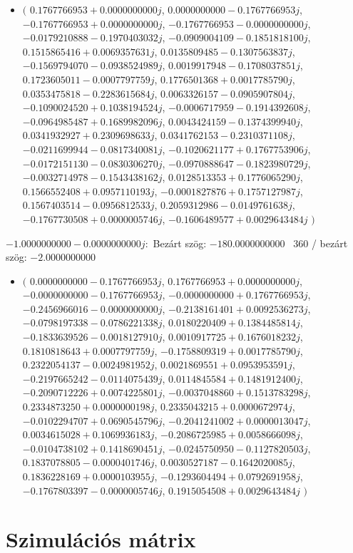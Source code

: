 \documentclass[14pt,a4paper]{article}
\begin{document}
\begin{itemize}
\item
$\big($
$0.1767766953+0.0000000000j$, $0.0000000000-0.1767766953j$, $-0.1767766953+0.0000000000j$, $-0.1767766953-0.0000000000j$, $-0.0179210888-0.1970403032j$, $-0.0909004109-0.1851818100j$, $0.1515865416+0.0069357631j$, $0.0135809485-0.1307563837j$, $-0.1569794070-0.0938524989j$, $0.0019917948-0.1708037851j$, $0.1723605011-0.0007797759j$, $0.1776501368+0.0017785790j$, $0.0353475818-0.2283615684j$, $0.0063326157-0.0905907804j$, $-0.1090024520+0.1038194524j$, $-0.0006717959-0.1914392608j$, $-0.0964985487+0.1689982096j$, $0.0043424159-0.1374399940j$, $0.0341932927+0.2309698633j$, $0.0341762153-0.2310371108j$, $-0.0211699944-0.0817340081j$, $-0.1020621177+0.1767753906j$, $-0.0172151130-0.0830306270j$, $-0.0970888647-0.1823980729j$, $-0.0032714978-0.1543438162j$, $0.0128513353+0.1776065290j$, $0.1566552408+0.0957110193j$, $-0.0001827876+0.1757127987j$, $0.1567403514-0.0956812533j$, $0.2059312986-0.0149761638j$, $-0.1767730508+0.0000005746j$, $-0.1606489577+0.0029643484j$
$\big)$
\end{itemize}
$-1.0000000000-0.0000000000j$:\
Bezárt szög: $-180.0000000000$ \
360 / bezárt szög: $-2.0000000000$\
\begin{itemize}
\item
$\big($
$0.0000000000-0.1767766953j$, $0.1767766953+0.0000000000j$, $-0.0000000000-0.1767766953j$, $-0.0000000000+0.1767766953j$, $-0.2456966016-0.0000000000j$, $-0.2138161401+0.0092536273j$, $-0.0798197338-0.0786221338j$, $0.0180220409+0.1384485814j$, $-0.1833639526-0.0018127910j$, $0.0010917725+0.1676018232j$, $0.1810818643+0.0007797759j$, $-0.1758809319+0.0017785790j$, $0.2322054137-0.0024981952j$, $0.0021869551+0.0953953591j$, $-0.2197665242-0.0114075439j$, $0.0114845584+0.1481912400j$, $-0.2090712226+0.0074225801j$, $-0.0037048860+0.1513783298j$, $0.2334873250+0.0000000198j$, $0.2335043215+0.0000672974j$, $-0.0102294707+0.0690545796j$, $-0.2041241002+0.0000013047j$, $0.0034615028+0.1069936183j$, $-0.2086725985+0.0058666098j$, $-0.0104738102+0.1418690451j$, $-0.0245750950-0.1127820503j$, $0.1837078805-0.0000401746j$, $0.0030527187-0.1642020085j$, $0.1836228169+0.0000103955j$, $-0.1293604494+0.0792691958j$, $-0.1767803397-0.0000005746j$, $0.1915054508+0.0029643484j$
$\big)$
\end{itemize}
\section{Szimulációs mátrix}
\end{document}
